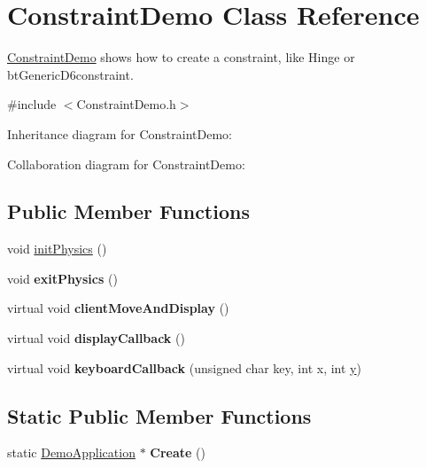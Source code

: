 \hypertarget{class_constraint_demo}{\section{Constraint\+Demo Class Reference}
\label{class_constraint_demo}
}


\hyperlink{class_constraint_demo}{Constraint\+Demo} shows how to create a constraint, like Hinge or bt\+Generic\+D6constraint.  




{\ttfamily \#include $<$Constraint\+Demo.\+h$>$}



Inheritance diagram for Constraint\+Demo\+:


Collaboration diagram for Constraint\+Demo\+:
\subsection*{Public Member Functions}
\begin{DoxyCompactItemize}
\item 
void \hyperlink{class_constraint_demo_af58c1359fe59e257f305f279f40551ac}{init\+Physics} ()
\item 
\hypertarget{class_constraint_demo_a007489942ad0a11e61c035730c393e4e}{void {\bfseries exit\+Physics} ()}\label{class_constraint_demo_a007489942ad0a11e61c035730c393e4e}

\item 
\hypertarget{class_constraint_demo_a3534c231cb5f3d6a8bb23492dabf963d}{virtual void {\bfseries client\+Move\+And\+Display} ()}\label{class_constraint_demo_a3534c231cb5f3d6a8bb23492dabf963d}

\item 
\hypertarget{class_constraint_demo_a5c34e8f194aff0a54f592c5a39908d70}{virtual void {\bfseries display\+Callback} ()}\label{class_constraint_demo_a5c34e8f194aff0a54f592c5a39908d70}

\item 
\hypertarget{class_constraint_demo_adf3202d62f2eccfa01849816c2c70c31}{virtual void {\bfseries keyboard\+Callback} (unsigned char key, int x, int \hyperlink{_ice_utils_8h_aa7ffaed69623192258fb8679569ff9ba}{y})}\label{class_constraint_demo_adf3202d62f2eccfa01849816c2c70c31}

\end{DoxyCompactItemize}
\subsection*{Static Public Member Functions}
\begin{DoxyCompactItemize}
\item 
\hypertarget{class_constraint_demo_aba89f51799f7b4ff40106b1cb7088d97}{static \hyperlink{class_demo_application}{Demo\+Application} $\ast$ {\bfseries Create} ()}\label{class_constraint_demo_aba89f51799f7b4ff40106b1cb7088d97}

\end{DoxyCompactItemize}

